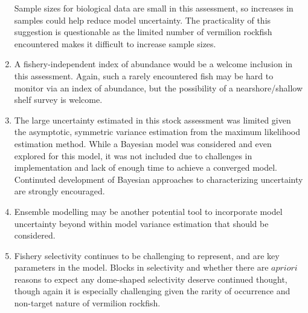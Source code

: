 \documentclass[11pt,
  english,
  a4paper,
]{article}
\begin{document}
\begin{enumerate}
  Sample sizes for biological data are small in this assessment, so increases in samples could help reduce model uncertainty. The practicality of this suggestion is questionable as the limited number of vermilion rockfish encountered makes it difficult to increase sample sizes.

  \tagmcend\tagstructend\tagstructend
\item

  A fishery-independent index of abundance would be a welcome inclusion in this assessment. Again, such a rarely encountered fish may be hard to monitor via an index of abundance, but the possibility of a nearshore/shallow shelf survey is welcome.

  \tagmcend\tagstructend\tagstructend
\item

  The large uncertainty estimated in this stock assessment was limited given the asymptotic, symmetric variance estimation from the maximum likelihood estimation method. While a Bayesian model was considered and even explored for this model, it was not included due to challenges in implementation and lack of enough time to achieve a converged model. Continuted development of Bayesian approaches to characterizing uncertainty are strongly encouraged.

  \tagmcend\tagstructend\tagstructend
\item

  Ensemble modelling may be another potential tool to incorporate model uncertainty beyond within model variance estimation that should be considered.

  \tagmcend\tagstructend\tagstructend
\item

  Fishery selectivity continues to be challenging to represent, and are key parameters in the model. Blocks in selectivity and whether there are {\(a priori\)\leavevmode\tagmcend\tagstructend} reasons to expect any dome-shaped selectivity deserve continued thought, though again it is especially challenging given the rarity of occurrence and non-target nature of vermilion rockfish.

  \tagmcend\tagstructend\tagstructend
\end{enumerate}
\end{document}
